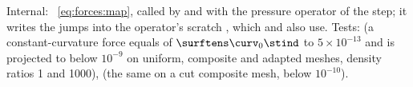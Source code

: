 \begin{implnote}
Internal: ~\cref{eq:forces:map},
called by  and  with the pressure
operator of the step; it writes the jumps into the operator's scratch
, which 
and  also
use. Tests: 
(a constant-curvature force equals  of
$\surftens\curv_0\stind$ to $5\times10^{-13}$ and is projected to below
$10^{-9}$ on uniform, composite and adapted meshes, density ratios 1 and
1000), 
(the same on a cut composite mesh, below $10^{-10}$).
\end{implnote}

